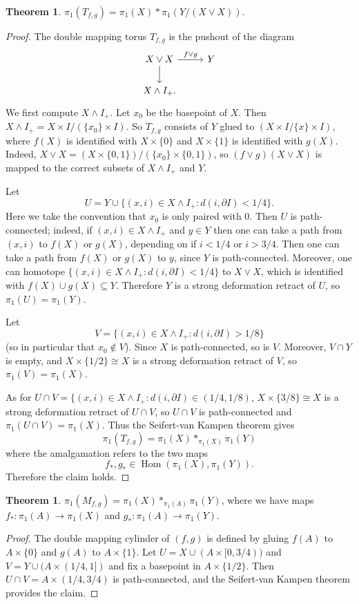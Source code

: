 \documentclass[10pt]{article}
\newcommand{\Hom}{\operatorname{Hom}}
\theoremstyle{definition}
\newtheorem{theorem}[lemma]{Theorem}
\begin{document}
\begin{theorem}
$\pi_1(T_{f,g}) = \pi_1(X) * \pi_1(Y/(X \vee X))$.
\end{theorem}
\begin{proof}
The double mapping torus $T_{f,g}$ is the pushout of the diagram
$$\begin{tikzcd}
X \vee X \arrow[r, "f \vee g"] \arrow[d] & Y\\
X \wedge I_+.
\end{tikzcd} $$
We first compute $X \wedge I_+$. Let $x_0$ be the basepoint of $X$. Then $X \wedge I_+ = X \times I/(\{x_0\} \times I)$.
So $T_{f,g}$ consists of $Y$ glued to $(X \times I/\{x\} \times I)$, where $f(X)$ is identified with $X \times \{0\}$ and $X \times \{1\}$ is identified with $g(X)$.
Indeed, $X \vee X = (X \times \{0, 1\})/(\{x_0\} \times \{0, 1\})$, so $(f \vee g)(X \vee X)$ is mapped to the correct subsets of $X \wedge I_+$ and $Y$.

Let
$$U = Y \cup \{(x, i) \in X \wedge I_+: d(i, \partial I) < 1/4\}.$$
Here we take the convention that $x_0$ is only paired with $0$.
Then $U$ is path-connected; indeed, if $(x, i) \in X \wedge I_+$ and $y \in Y$ then one can take a path from $(x, i)$ to $f(X)$ or $g(X)$, depending on if $i < 1/4$ or $i > 3/4$.
Then one can take a path from $f(X)$ or $g(X)$ to $y$, since $Y$ is path-connected.
Moreover, one can homotope $\{(x, i) \in X \wedge I_+: d(i, \partial I) < 1/4\}$ to $X \vee X$, which is identified with $f(X) \cup g(X) \subseteq Y$.
Therefore $Y$ is a strong deformation retract of $U$, so $\pi_1(U) = \pi_1(Y)$.

Let
$$V = \{(x, i) \in X \wedge I_+: d(i, \partial I) > 1/8\}$$
(so in particular that $x_0 \notin V$). Since $X$ is path-connected, so is $V$.
Moreover, $V \cap Y$ is empty, and $X \times \{1/2\} \cong X$ is a strong deformation retract of $V$, so $\pi_1(V) = \pi_1(X)$.

As for $U \cap V = \{(x, i) \in X \wedge I_+: d(i, \partial I) \in (1/4, 1/8)$, $X \times \{3/8\} \cong X$ is a strong deformation retract of $U \cap V$, so $U \cap V$ is path-connected and $\pi_1(U \cap V) = \pi_1(X)$.
Thus the Seifert-van Kampen theorem gives
$$\pi_1(T_{f,g}) = \pi_1(X) *_{\pi_1(X)} \pi_1(Y)$$
where the amalgamation refers to the two maps
$$f_*, g_* \in \Hom(\pi_1(X), \pi_1(Y)).$$
Therefore the claim holds.
\end{proof}

\begin{theorem}
$\pi_1(M_{f,g}) = \pi_1(X) *_{\pi_1(A)} \pi_1(Y)$, where we have maps $f_*: \pi_1(A) \to \pi_1(X)$ and $g_*: \pi_1(A) \to \pi_1(Y)$.
\end{theorem}
\begin{proof}
The double mapping cylinder of $(f, g)$ is defined by gluing $f(A)$ to $A \times \{0\}$ and $g(A)$ to $A \times \{1\}$.
Let $U = X \cup (A \times [0, 3/4))$ and $V = Y \cup (A \times (1/4, 1])$ and fix a basepoint in $A \times \{1/2\}$.
Then $U \cap V = A \times (1/4, 3/4)$ is path-connected, and the Seifert-van Kampen theorem provides the claim.
\end{proof}
\end{document}
